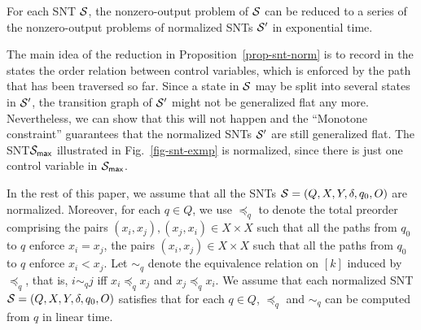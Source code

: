 \begin{proposition}\label{prop-snt-norm}
For each SNT ${\mathcal{S} }$, the nonzero-output problem of ${\mathcal{S} }$ can be reduced to a series of the nonzero-output problems of normalized SNTs ${\mathcal{S} }'$ in exponential time.
\end{proposition}

The main idea of the reduction in Proposition~\ref{prop-snt-norm} is to record in the states the order relation between control variables, which is enforced by the path that has been traversed so far. Since a state in ${\mathcal{S} }$ may be split into several states in ${\mathcal{S} }'$, the transition graph of ${\mathcal{S} }'$ might not be generalized flat any more. Nevertheless, we can show that this will not happen and the ``Monotone  constraint'' guarantees that the normalized SNTs ${\mathcal{S} }'$ are still generalized flat. The SNT${\mathcal{S} }_{\sf max}$  illustrated in Fig.~\ref{fig-snt-exmp} is normalized, since there is just one control variable in ${\mathcal{S} }_{\sf max}$.



In the rest of this paper, we assume that all the SNTs ${\mathcal{S} }=(Q, X, Y, \delta, q_0, O)$  are normalized. Moreover, for each $q \in Q$, we use $\preceq_q$ to denote the total preorder comprising the pairs $(x_i, x_j), (x_j, x_i) \in X \times X$ such that all the paths from $q_0$ to $q$ enforce $x_i = x_j$, the pairs $ (x_i, x_j)  \in X \times X$ such that all the paths from $q_0$ to $q$ enforce $x_i < x_j$. Let $\sim_q$ denote the equivalence relation on $[k]$ induced by $\preceq_q$, that is, $i \sim_q j$ iff $x_i \preceq_q x_j$ and $x_j \preceq_q x_i$. We assume that each normalized SNT ${\mathcal{S} }=(Q, X, Y, \delta, q_0, O)$ satisfies that for each $q \in Q$, $\preceq_q$ and $\sim_q$ can be computed from $q$ in linear time.

